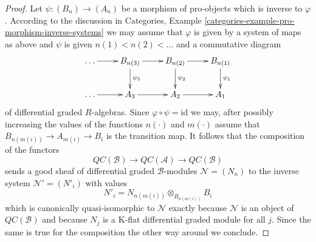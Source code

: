 \documentclass[10pt,a4paper]{amsart}
\theoremstyle{plain}
\theoremstyle{definition}
\theoremstyle{remark}
\numberwithin{equation}{subsection}
\begin{document}
\begin{proof}
Let $\psi : (B_n) \to (A_n)$ be a morphism of pro-objects which
is inverse to $\varphi$. According to the discussion in
Categories, Example
\ref{categories-example-pro-morphism-inverse-systems}
we may assume that $\varphi$ is given by a system of maps
as above and $\psi$ is given $n(1) < n(2) < \ldots$ and
a commutative diagram
$$
\xymatrix{
\ldots \ar[r] &
B_{n(3)} \ar[d]^{\psi_3} \ar[r] &
B_{n(2)} \ar[d]^{\psi_2} \ar[r] &
B_{n(1)} \ar[d]^{\psi_1} \\
\ldots \ar[r] &
A_3 \ar[r] &
A_2 \ar[r] &
A_1
}
$$
of differential graded $R$-algebras. Since
$\varphi \circ \psi = \text{id}$ we may, after possibly
increasing the values of the functions $n(\cdot)$ and
$m(\cdot)$ assume that $B_{n(m(i))} \to A_{m(i)} \to B_i$
is the transition map. It follows that the composition of the
functors
$$
\mathit{QC}(\mathcal{B}) \to
\mathit{QC}(\mathcal{A}) \to
\mathit{QC}(\mathcal{B})
$$
sends a good sheaf of
differential graded $\mathcal{B}$-modules $\mathcal{N} = (N_n)$
to the inverse system $\mathcal{N}' = (N'_i)$ with values
$$
N'_i = N_{n(m(i))} \otimes_{B_{n(m(i))}} B_i
$$
which is canonically quasi-isomorphic to $\mathcal{N}$
exactly because $\mathcal{N}$ is an object of
$\mathit{QC}(\mathcal{B})$
and because $N_j$ is a K-flat differential graded
module for all $j$. Since the same is true for the
composition the other way around we conclude.
\end{proof}
\end{document}
